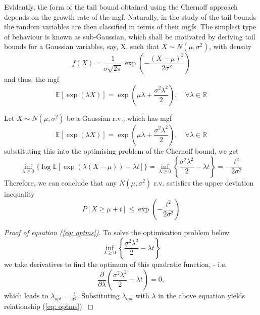 \documentclass[10pt,handout,english]{beamer}
\newcommand{\E}{\mathbb{E}}
\begin{document}
\begin{frame}[allowframebreaks]
Evidently, the form of the tail bound obtained using the Chernoff approach depends on the growth rate of the mgf. Naturally, in the study of the tail bounds the random variables are then classified in terms of their mgfs. The simplest type of behaviour is known as sub-Gaussian, which shall be motivated by deriving tail bounds for a Gaussian variables, say, X, such that $X\sim N(\mu,\sigma^2)$, with density
\[
f(X)=\frac{1}{\sigma\sqrt{2\pi}}\exp\left(-\frac{(X-\mu)^2}{2\sigma^2}\right)
\]
and thus, the mgf
\[
\E[\exp(\lambda X)]=\exp\left(\mu\lambda+\frac{\sigma^2\lambda^2}{2}\right),\quad\forall\lambda\in\mathbb{R}
\]
\begin{example}
Let $X\sim N(\mu,\sigma^2)$ be a Gaussian r.v., which has mgf
\[
\E[\exp(\lambda X)]=\exp\left(\mu\lambda+\frac{\sigma^2\lambda^2}{2}\right),\quad \forall \lambda\in \mathbb{R}
\]
substituting this into the optimising problem of the Chernoff bound, we get
\begin{equation}\label{eq: optms}
\inf_{\lambda\geq 0}\{\log\E[\exp(\lambda(X-\mu))-\lambda t]\}=\inf_{\lambda\geq 0}\left\{\frac{\sigma^2\lambda^2}{2}-\lambda t\right\}=-\frac{t^2}{2\sigma^2}
\end{equation}
Therefore, we can conclude that any $N(\mu,\sigma^2)$ r.v. satisfies the upper deviation inequality
\begin{equation}\label{eq: Sub-Gaussian TB}
P[X\geq\mu+t]\leq\exp\left(-\frac{t^2}{2\sigma^2}\right)
\end{equation}
\end{example}
\end{frame}
\begin{frame}
\begin{proof}[Proof of equation (\ref{eq: optms})]
To solve the optimisation problem below 
\[
\inf_{\lambda\geq 0}\left\{\frac{\sigma^2\lambda^2}{2}-\lambda t\right\}
\]
we take derivatives to find the optimum of this quadratic function, - i.e.
\[
\frac{\partial}{\partial\lambda}\left(\frac{\sigma^2\lambda^2}{2}-\lambda t\right)=0,
\]
which leads to $\lambda_{opt}=\frac{t}{\sigma^2}$. Substituting $\lambda_{opt}$ with $\lambda$ in the above equation yields relationship (\ref{eq: optms}).
\end{proof}
\end{frame}
\end{document}
